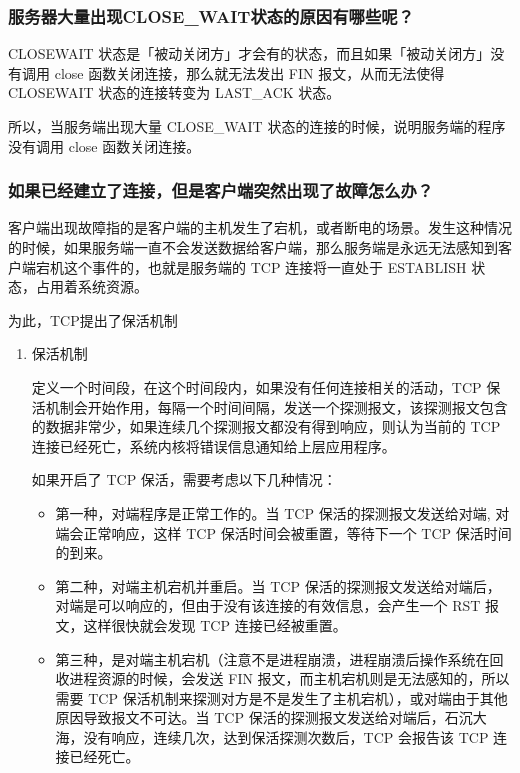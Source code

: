 \documentclass[11pt]{article}
\begin{document}
\subsubsection{服务器大量出现CLOSE\_WAIT状态的原因有哪些呢？}
\label{sec:org1ee4622}
CLOSEWAIT 状态是「被动关闭方」才会有的状态，而且如果「被动关闭方」没有调用 close 函数关闭连接，那么就无法发出 FIN 报文，从而无法使得 CLOSEWAIT 状态的连接转变为 LAST\_ACK 状态。

所以，当服务端出现大量 CLOSE\_WAIT 状态的连接的时候，说明服务端的程序没有调用 close 函数关闭连接。
\subsubsection{如果已经建立了连接，但是客户端突然出现了故障怎么办？}
\label{sec:org7f9bdfd}

客户端出现故障指的是客户端的主机发生了宕机，或者断电的场景。发生这种情况的时候，如果服务端一直不会发送数据给客户端，那么服务端是永远无法感知到客户端宕机这个事件的，也就是服务端的 TCP 连接将一直处于 ESTABLISH 状态，占用着系统资源。

为此，TCP提出了保活机制

\begin{enumerate}
\item 保活机制
\label{sec:orgac4c888}

定义一个时间段，在这个时间段内，如果没有任何连接相关的活动，TCP 保活机制会开始作用，每隔一个时间间隔，发送一个探测报文，该探测报文包含的数据非常少，如果连续几个探测报文都没有得到响应，则认为当前的 TCP 连接已经死亡，系统内核将错误信息通知给上层应用程序。

如果开启了 TCP 保活，需要考虑以下几种情况：
\begin{itemize}
\item 第一种，对端程序是正常工作的。当 TCP 保活的探测报文发送给对端, 对端会正常响应，这样 TCP 保活时间会被重置，等待下一个 TCP 保活时间的到来。
\item 第二种，对端主机宕机并重启。当 TCP 保活的探测报文发送给对端后，对端是可以响应的，但由于没有该连接的有效信息，会产生一个 RST 报文，这样很快就会发现 TCP 连接已经被重置。
\item 第三种，是对端主机宕机（注意不是进程崩溃，进程崩溃后操作系统在回收进程资源的时候，会发送 FIN 报文，而主机宕机则是无法感知的，所以需要 TCP 保活机制来探测对方是不是发生了主机宕机），或对端由于其他原因导致报文不可达。当 TCP 保活的探测报文发送给对端后，石沉大海，没有响应，连续几次，达到保活探测次数后，TCP 会报告该 TCP 连接已经死亡。
\end{itemize}
\end{enumerate}
\end{document}
